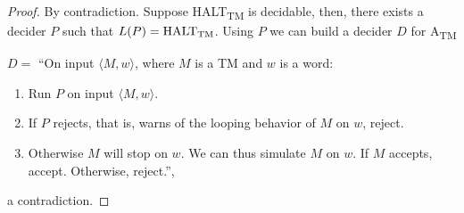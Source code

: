 \documentclass{article}
\newcommand{\TM}{TM}
\newcommand{\Atm}{A\textsubscript{TM}}
\newcommand{\HALTtm}{HALT\textsubscript{TM}}
\begin{document}
\begin{proof}
By contradiction. Suppose \HALTtm{} is decidable, then,
there exists a decider \(P\) such that \(L(P) =
\text{\HALTtm{}} \). Using \(P\) we
can build a decider \(D\) for \Atm{}

\(D =\) ``On input \(\langle M,w \rangle\), where \(M\) is a \TM{} and \(w\) is
a word:
\begin{enumerate}
	\item Run \(P\) on input \(\langle M,w \rangle\).
	\item If \(P\) rejects, that is, warns of the looping behavior of \(M\) on
		\(w\), reject.
	\item Otherwise \(M\) will stop on \(w\). We can thus simulate \(M\) on
		\(w\). If \(M\) accepts, accept. Otherwise, reject.'',
\end{enumerate}
a contradiction.
\end{proof}
\end{document}
